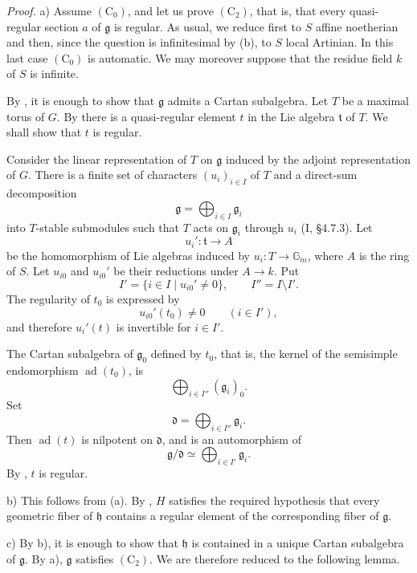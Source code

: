 \smallskip
\noindent
\emph{Proof.}
\textup{a)}
Assume \((\mathrm C_0)\), and let us prove \((\mathrm C_2)\), that
is, that every quasi-regular section \(a\) of \(\mathfrak g\) is
regular. As usual, we reduce first to \(S\) affine noetherian and
then, since the question is infinitesimal by \textup{(b)}, to
\(S\) local Artinian. In this last case \((\mathrm C_0)\) is
automatic. We may moreover suppose that the residue field \(k\)
of \(S\) is infinite.

By , it is enough to show that \(\mathfrak g\) admits a Cartan
subalgebra. Let \(T\) be a maximal torus of \(G\). By  there is
a quasi-regular element \(t\) in the Lie algebra \(\mathfrak t\)
of \(T\). We shall show that \(t\) is regular.

Consider the linear representation of \(T\) on \(\mathfrak g\)
induced by the adjoint representation of \(G\). There is a finite
set of characters \((u_i)_{i\in I}\) of \(T\) and a direct-sum
decomposition
\[
  \mathfrak g=\bigoplus_{i\in I}\mathfrak g_i
\]
into \(T\)-stable submodules such that \(T\) acts on
\(\mathfrak g_i\) through \(u_i\)
\textup{(I, \S4.7.3)}. Let
\[
  u_i'\colon\mathfrak t\longrightarrow A
\]
be the homomorphism of Lie algebras induced by
\(u_i\colon T\to\mathbb G_m\), where \(A\) is the ring of \(S\).
Let \(u_{i0}\) and \(u_{i0}'\) be their reductions under
\(A\to k\). Put
\[
  I'=\{i\in I\mid u_{i0}'\ne0\},
  \qquad I''=I\setminus I'.
\]
The regularity of \(t_0\) is expressed by
\[
  u_{i0}'(t_0)\ne0\qquad(i\in I'),
\]
and therefore \(u_i'(t)\) is invertible for \(i\in I'\).

The Cartan subalgebra of \(\mathfrak g_0\) defined by \(t_0\), that
is, the kernel of the semisimple endomorphism
\(\operatorname{ad}(t_0)\), is
\[
  \bigoplus_{i\in I''}(\mathfrak g_i)_0.
\]
Set
\[
  \mathfrak d=\bigoplus_{i\in I''}\mathfrak g_i.
\]
Then \(\operatorname{ad}(t)\) is nilpotent on \(\mathfrak d\), and
is an automorphism of
\[
  \mathfrak g/\mathfrak d
  \simeq\bigoplus_{i\in I'}\mathfrak g_i.
\]
By , \(t\) is regular.

\smallskip
\noindent
\textup{b)}
This follows from \textup{(a)}. By , \(H\) satisfies the
required hypothesis that every geometric fiber of \(\mathfrak h\)
contains a regular element of the corresponding fiber of
\(\mathfrak g\).

\smallskip
\noindent
\textup{c)}
By \textup{b)}, it is enough to show that \(\mathfrak h\) is
contained in a unique Cartan subalgebra of \(\mathfrak g\). By
\textup{a)}, \(\mathfrak g\) satisfies \((\mathrm C_2)\). We are
therefore reduced to the following lemma.

